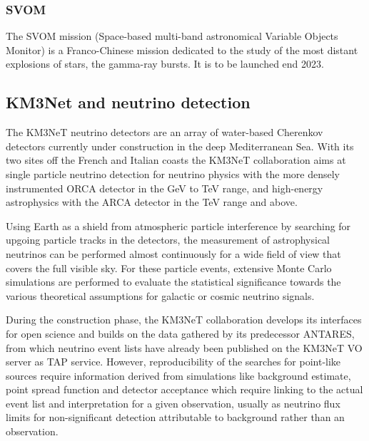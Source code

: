 \documentclass[11pt,a4paper]{ivoa}
\begin{document}


\subsubsection{SVOM}

The SVOM mission (Space-based multi-band astronomical Variable Objects Monitor) is a Franco-Chinese mission dedicated to the study of the most distant explosions of stars, the gamma-ray bursts. It is to be launched end 2023.




\subsection{KM3Net and neutrino detection}

The KM3NeT neutrino detectors are an array of water-based Cherenkov detectors currently under construction in the deep Mediterranean Sea. With its two sites off the French and Italian coasts the KM3NeT collaboration aims at single particle neutrino detection for neutrino physics with the more densely instrumented ORCA detector in the GeV to TeV range, and high-energy astrophysics with the ARCA detector in the TeV range and above.

Using Earth as a shield from atmospheric particle interference by searching for upgoing particle tracks in the detectors, the measurement of astrophysical neutrinos can be performed almost continuously for a wide field of view that covers the full visible sky. For these particle events, extensive Monte Carlo simulations are performed to evaluate the statistical significance towards the various theoretical assumptions for galactic or cosmic neutrino signals.

During the construction phase, the KM3NeT collaboration develops its interfaces for open science and builds on the data gathered by its predecessor ANTARES, from which neutrino event lists have already been published on the KM3NeT VO server as TAP service. However, reproducibility of the searches for point-like sources require information derived from simulations like background estimate, point spread function and detector acceptance which require linking to the actual event list and interpretation for a given observation, usually as neutrino flux limits for non-significant detection attributable to background rather than an observation.
\end{document}
